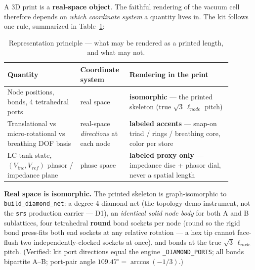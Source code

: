 A 3D print is a \textbf{real-space object}. The faithful rendering of the vacuum cell therefore depends on \emph{which coordinate system} a quantity lives in. The kit follows one rule, summarized in Table~\ref{tab:vol9_exp_print_representation}:

\begin{table}[htbp]
\centering
\caption{Representation principle --- what may be rendered as a printed length, and what may not.}
\label{tab:vol9_exp_print_representation}
\begin{tabular}{p{0.30\linewidth} p{0.18\linewidth} p{0.42\linewidth}}
\toprule
\textbf{Quantity} & \textbf{Coordinate system} & \textbf{Rendering in the print} \\
\midrule
Node positions, bonds, 4 tetrahedral ports & real space & \textbf{isomorphic} --- the printed skeleton (true $\sqrt{3}\,\ell_{node}$ pitch) \\
Translational vs micro-rotational vs breathing DOF basis & real-space \emph{directions} at each node & \textbf{labeled accents} --- snap-on triad / rings / breathing core, color per store \\
LC-tank state, $(V_{inc}, V_{ref})$ phasor / impedance plane & phase space & \textbf{labeled proxy only} --- impedance disc + phasor dial, never a spatial length \\
\bottomrule
\end{tabular}
\end{table}

\textbf{Real space is isomorphic.} The printed skeleton is graph-isomorphic to \texttt{build\_diamond\_net}: a degree-4 diamond net (the topology-demo instrument, not the \texttt{srs} production carrier --- D1), an \emph{identical solid node body} for both A and B sublattices, four tetrahedral \textbf{round} bond sockets per node (round so the rigid bond press-fits both end sockets at any relative rotation --- a hex tip cannot face-flush two independently-clocked sockets at once), and bonds at the true $\sqrt{3}\,\ell_{node}$ pitch. (Verified: kit port directions equal the engine \texttt{\_DIAMOND\_PORTS}; all bonds bipartite A--B; port-pair angle $109.47^\circ = \arccos(-1/3)$.)

